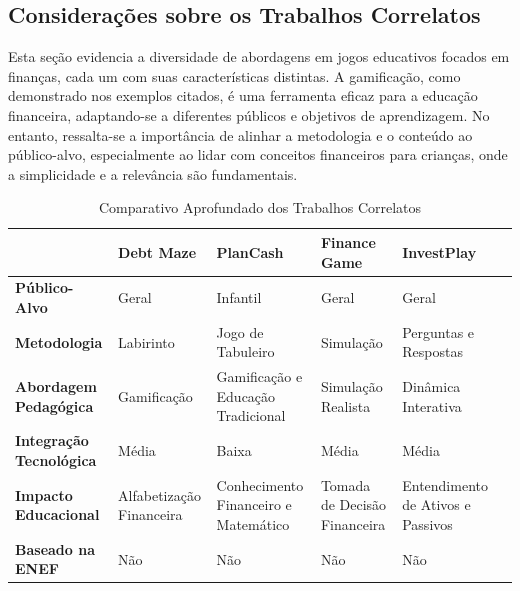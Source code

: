 \subsection{Considerações sobre os Trabalhos Correlatos}
Esta seção evidencia a diversidade de abordagens em jogos educativos focados em finanças, cada um com suas características distintas. A gamificação, como demonstrado nos exemplos citados, é uma ferramenta eficaz para a educação financeira, adaptando-se a diferentes públicos e objetivos de aprendizagem. No entanto, ressalta-se a importância de alinhar a metodologia e o conteúdo ao público-alvo, especialmente ao lidar com conceitos financeiros para crianças, onde a simplicidade e a relevância são fundamentais.

\begin{table}[ht]
	\centering
	\renewcommand{\arraystretch}{1.3}
	\caption{Comparativo Aprofundado dos Trabalhos Correlatos}
	\label{tab:comparativo-trabalhos}
	\begin{tabular}{| L{2cm} | L{2cm} | L{2cm} | L{2cm} | L{2cm} | L{2cm} |}
		\hline
		\textbf{}                       & \textbf{Debt Maze}       & \textbf{PlanCash}                    & \textbf{Finance Game}        & \textbf{InvestPlay}               \\
		\hline
		\hline
		\textbf{Público-Alvo}           & Geral                    & Infantil                             & Geral                        & Geral                             \\
		\hline
		\textbf{Metodologia}            & Labirinto                & Jogo de Tabuleiro                    & Simulação                    & Perguntas e Respostas             \\
		\hline
		\textbf{Abordagem Pedagógica}   & Gamificação              & Gamificação e Educação Tradicional   & Simulação Realista           & Dinâmica Interativa               \\
		\hline
		\textbf{Integração Tecnológica} & Média                    & Baixa                                & Média                        & Média                             \\
		\hline
		\textbf{Impacto Educacional}    & Alfabetização Financeira & Conhecimento Financeiro e Matemático & Tomada de Decisão Financeira & Entendimento de Ativos e Passivos \\
		\hline
		\textbf{Baseado na ENEF}        & Não                      & Não                                  & Não                          & Não                               \\
		\hline
	\end{tabular}
	\vspace{2mm}
\end{table}
